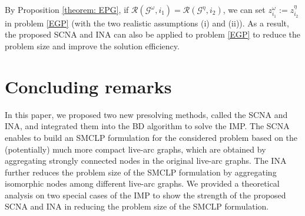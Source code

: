 \documentclass[a4paper,10pt]{article}
\newcommand{\G}{\mathcal{G}}
\theoremstyle{plain}
\begin{document}
	By Proposition \ref{theorem: EPG}, if $\mathcal{R}(\mathcal{G}^\omega,i_1) = \mathcal{R}(\mathcal{G}^\eta,i_2)$, we can set $z_{i_1}^\omega:=z_{i_2}^\eta$ in problem \eqref{EGP} (with the two realistic assumptions (i) and (ii)).
	As a result, the proposed SCNA and INA can also be applied to problem \eqref{EGP} to reduce the problem size and improve the solution efficiency.

	\section{Concluding remarks}
	\label{Sect:conclusions}
	In this paper, we proposed two new presolving methods, called the SCNA and INA, and integrated them into the BD algorithm to solve the IMP.
	The SCNA enables to build an SMCLP formulation for the considered problem based on the (potentially) much more compact live-arc graphs, which are obtained by aggregating strongly connected nodes in the original live-arc graphs.
	The INA further reduces the problem size of the SMCLP formulation by aggregating isomorphic nodes among different live-arc graphs.
	We provided a theoretical analysis on two special cases of the IMP to show the strength of the proposed SCNA and INA in reducing the problem size of the SMCLP formulation.
\end{document}
